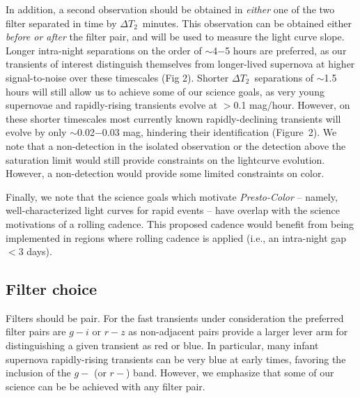 \documentclass[12pt, letterpaper]{article}
\newcommand{\dttwo}{\ensuremath{\Delta T_2}}
\begin{document}
In addition, a second observation should be obtained in \emph{either} one of the two filter separated in time by \dttwo\ minutes. This observation can be obtained either \emph{before or after} the filter pair, and will be used to measure the light curve slope. Longer intra-night separations on the order of $\sim$4$-$5 hours are preferred, as our transients of interest distinguish themselves from longer-lived supernova at higher signal-to-noise over these timescales (Fig 2). Shorter \dttwo\ separations of $\sim$1.5 hours will still allow us to achieve some of our science goals, as very young supernovae and rapidly-rising transients evolve at $>$0.1 mag/hour. However, on these shorter timescales most currently known rapidly-declining transients will evolve by only $\sim$0.02$-$0.03 mag, hindering their identification (Figure~2).   
We note that a non-detection in the isolated observation or the detection above the saturation limit would still provide constraints on the lightcurve evolution. However, a non-detection would provide some limited constraints on color.

Finally, we note that the science goals which motivate {\em Presto-Color} -- namely, well-characterized light curves for rapid events -- have overlap with the science motivations of a rolling cadence. This proposed cadence would benefit from being implemented in regions where rolling cadence is applied (i.e., an intra-night gap $<3$ days).


\subsection{Filter choice}

\noindent Filters should be pair. For the fast transients under consideration the preferred filter pairs are  $g-i$ or $r-z$ as non-adjacent pairs provide a larger lever arm for distinguishing a given transient as red or blue. In particular, many infant supernova rapidly-rising transients can be very blue at early times, favoring the inclusion of the $g-$ (or $r-$) band. However, we emphasize that some of our science can be be achieved with any filter pair.


\end{document}

